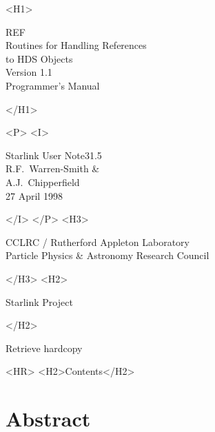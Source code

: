 \documentclass[twoside,11pt]{article}
\newcommand{\stardoccategory}  {Starlink User Note}
\newcommand{\stardocsource}    {sun\stardocnumber}
\newcommand{\stardocnumber}    {31.5}
\newcommand{\stardocauthors}   {R.F.~Warren-Smith \& \\
                                A.J.~Chipperfield}
\newcommand{\stardocdate}      {27 April 1998}
\newcommand{\stardoctitle}     {REF \\ [1ex]
                                Routines for Handling References\\
                                to HDS Objects}
\newcommand{\stardocversion}   {Version 1.1}
\newcommand{\stardocmanual}    {Programmer's Manual}
\newcommand{\htmladdnormallink}[2]{#1}
\newcommand{\htmladdimg}[1]{}
\newcommand{\htmlref}[2]{#1}
\newcommand{\htmladdtonavigation}[1]{}
\newcommand{\xlabel}[1]{}
\newcommand{\latexonlytoc}[0]{\tableofcontents}
\begin{document}
\begin{htmlonly}
   \xlabel{}
   \begin{rawhtml} <H1> \end{rawhtml}
      \stardoctitle\\
      \stardocversion\\
      \stardocmanual
   \begin{rawhtml} </H1> \end{rawhtml}


   \begin{rawhtml} <P> <I> \end{rawhtml}
   \stardoccategory \stardocnumber \\
   \stardocauthors \\
   \stardocdate
   \begin{rawhtml} </I> </P> <H3> \end{rawhtml}
      \htmladdnormallink{CCLRC}{http://www.cclrc.ac.uk} /
      \htmladdnormallink{Rutherford Appleton Laboratory}
                        {http://www.cclrc.ac.uk/ral} \\
      \htmladdnormallink{Particle Physics \& Astronomy Research Council}
                        {http://www.pparc.ac.uk} \\
   \begin{rawhtml} </H3> <H2> \end{rawhtml}
      \htmladdnormallink{Starlink Project}{http://star-www.rl.ac.uk/}
   \begin{rawhtml} </H2> \end{rawhtml}
   \htmladdnormallink{\htmladdimg{source.gif} Retrieve hardcopy}
      {http://star-www.rl.ac.uk/cgi-bin/hcserver?\stardocsource}\\

  \label{stardoccontents}
  \begin{rawhtml} 
    <HR>
    <H2>Contents</H2>
  \end{rawhtml}
  \renewcommand{\latexonlytoc}[0]{}
  \htmladdtonavigation{\htmlref{\htmladdimg{contents_motif.gif}}
        {stardoccontents}}

  \section{\xlabel{abstract}Abstract}
\end{htmlonly}
\end{document}

